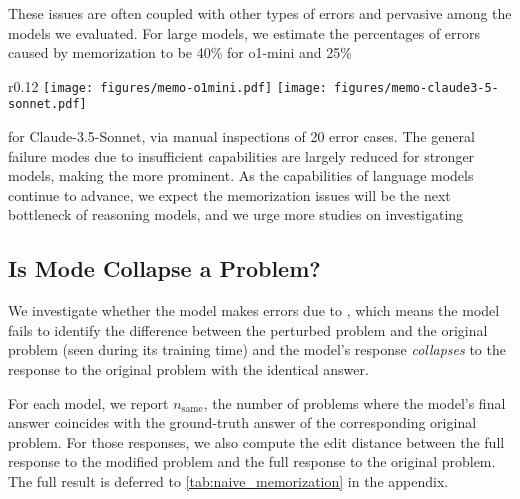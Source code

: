  
    These issues are often coupled with other types of errors and pervasive among the models we evaluated. 
    For large models, we estimate the percentages of errors caused by memorization to be 40\% for o1-mini and 25\% 
    \begin{wrapfigure}{r}{0.12\textwidth}
        \centering
        \texttt{[image: figures/memo-o1mini.pdf]}
        \vspace{4mm}
        \texttt{[image: figures/memo-claude3-5-sonnet.pdf]} 
        \vspace{-2mm}
        \label{fig:memo_percentage}
    \end{wrapfigure}
    for Claude-3.5-Sonnet, via manual inspections of 20 error cases.
    The general failure modes due to insufficient capabilities are largely reduced for stronger models, making the  more prominent. 
    As the capabilities of language models continue to advance, we expect the memorization issues will be the next bottleneck of reasoning models, and we urge more studies on investigating 



 



 




















\subsection{Is Mode Collapse a Problem?}
\label{sec:naive:memorization}

We investigate whether the model makes errors due to , which means the model fails to identify the difference between the perturbed problem and the original problem (seen during its training time) and the model's response \textit{collapses} to the response to the original problem with the identical answer. 


For each model, we report $n_{\text{same}}$, the number of problems where the model's final answer coincides with the ground-truth answer of the corresponding original problem. For those responses, we also compute the edit distance between the full response to the modified problem and the full response to the original problem. The full result is deferred to \cref{tab:naive_memorization} in the appendix. 


